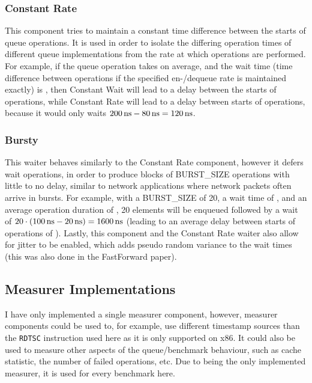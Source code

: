 \subsubsection*{Constant Rate}
This component tries to maintain a constant time difference between the starts of queue operations.
It is used in order to isolate the differing operation times of different queue implementations from the rate
at which operations are performed.
For example, if the queue operation takes  on average, and the wait time (time difference between
operations if the specified en-/dequeue rate is maintained exactly) is , then Constant Wait will lead
to a  delay between the starts of operations, while Constant Rate will lead to a  delay
between starts of operations, because it would only waits $\SI{200}{\nano\second}-\SI{80}{\nano\second}=\SI{120}{\nano\second}$.

\subsubsection*{Bursty}
This waiter behaves similarly to the Constant Rate component, however it defers wait operations, in order to
produce blocks of BURST\_SIZE operations with little to no delay, similar to network applications where
network packets often arrive in bursts.
For example, with a BURST\_SIZE of 20, a wait time of , and an average operation duration of ,
20 elements will be enqueued followed by a wait of $20\cdot(\SI{100}{\nano\second} - \SI{20}{\nano\second}) = \SI{1600}{\nano\second}$ (leading to an average
delay between starts of operations of ).
Lastly, this component and the Constant Rate waiter also allow for jitter to be enabled, which adds pseudo
random variance to the wait times (this was also done in the FastForward paper\cite{FastForward}).

\subsection{Measurer Implementations}
I have only implemented a single measurer component, however, measurer components could be used to, for
example, use different timestamp sources than the \texttt{RDTSC} instruction used here as it is only supported on x86.
It could also be used to measure other aspects of the queue/benchmark behaviour, such as cache statistic, the
number of failed operations, etc.
Due to being the only implemented measurer, it is used for every benchmark here.
